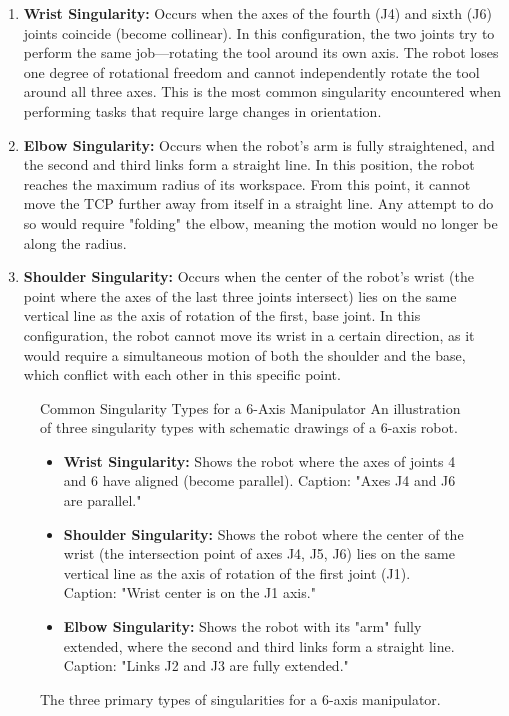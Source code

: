 \begin{enumerate}
    \item \textbf{Wrist Singularity:} Occurs when the axes of the fourth (J4) and sixth (J6) joints coincide (become collinear). In this configuration, the two joints try to perform the same job—rotating the tool around its own axis. The robot loses one degree of rotational freedom and cannot independently rotate the tool around all three axes. This is the most common singularity encountered when performing tasks that require large changes in orientation.

    \item \textbf{Elbow Singularity:} Occurs when the robot's arm is fully straightened, and the second and third links form a straight line. In this position, the robot reaches the maximum radius of its workspace. From this point, it cannot move the TCP further away from itself in a straight line. Any attempt to do so would require "folding" the elbow, meaning the motion would no longer be along the radius.

    \item \textbf{Shoulder Singularity:} Occurs when the center of the robot's wrist (the point where the axes of the last three joints intersect) lies on the same vertical line as the axis of rotation of the first, base joint. In this configuration, the robot cannot move its wrist in a certain direction, as it would require a simultaneous motion of both the shoulder and the base, which conflict with each other in this specific point.
\end{enumerate}

\begin{figure}[h!]
    \centering
    \begin{infobox}{Common Singularity Types for a 6-Axis Manipulator}
        An illustration of three singularity types with schematic drawings of a 6-axis robot.
        \begin{itemize}
            \item \textbf{Wrist Singularity:} Shows the robot where the axes of joints 4 and 6 have aligned (become parallel). Caption: "Axes J4 and J6 are parallel."
            \item \textbf{Shoulder Singularity:} Shows the robot where the center of the wrist (the intersection point of axes J4, J5, J6) lies on the same vertical line as the axis of rotation of the first joint (J1). Caption: "Wrist center is on the J1 axis."
            \item \textbf{Elbow Singularity:} Shows the robot with its "arm" fully extended, where the second and third links form a straight line. Caption: "Links J2 and J3 are fully extended."
        \end{itemize}
    \end{infobox}
    \caption{The three primary types of singularities for a 6-axis manipulator.}
    \label{fig:singularity_types}
\end{figure}

